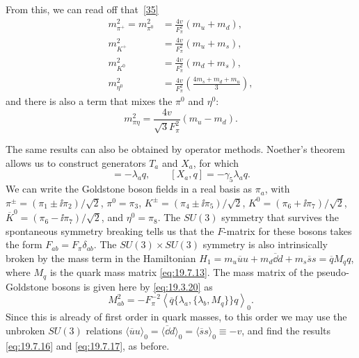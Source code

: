 From this, we can read off that~\hyperref[ch19-ref-35]{[35]}
\begin{equation}
\begin{aligned}
m_{\pi^+}^2=m_{\pi^0}^2
&=\frac{4v}{F_\pi^2}(m_u+m_d),\\
m_{K^+}^2
&=\frac{4v}{F_\pi^2}(m_u+m_s),\\
m_{K^0}^2
&=\frac{4v}{F_\pi^2}(m_d+m_s),\\
m_{\eta^0}^2
&=\frac{4v}{F_\pi^2}
\left(\frac{4m_s+m_d+m_u}{3}\right),
\end{aligned}
\tag{19.7.16}\label{eq:19.7.16}
\end{equation}
and there is also a term that mixes the $\pi^0$ and $\eta^0$:
\begin{equation}
m_{\pi\eta}^2
=\frac{4v}{\sqrt3F_\pi^2}(m_u-m_d).
\tag{19.7.17}\label{eq:19.7.17}
\end{equation}

The same results can also be obtained by operator methods. Noether's theorem allows us to construct generators $T_a$ and $X_a$, for which
\begin{equation}
[T_a,q]=-\lambda_aq,
\qquad
[X_a,q]=-\gamma_5\lambda_aq.
\tag{19.7.18}\label{eq:19.7.18}
\end{equation}
We can write the Goldstone boson fields in a real basis as $\pi_a$, with $\pi^\pm=(\pi_1\pm \ii\pi_2)/\sqrt2$, $\pi^0=\pi_3$, $K^\pm=(\pi_4\pm \ii\pi_5)/\sqrt2$, $K^0=(\pi_6+\ii\pi_7)/\sqrt2$, $\overline K^0=(\pi_6-\ii\pi_7)/\sqrt2$, and $\eta^0=\pi_8$. The $SU(3)$ symmetry that survives the spontaneous symmetry breaking tells us that the $F$-matrix for these bosons takes the form $F_{ab}=F_\pi\delta_{ab}$. The $SU(3)\times SU(3)$ symmetry is also intrinsically broken by the mass term in the Hamiltonian $H_1=m_u\overline uu+m_d\overline \dd d+m_s\overline ss=\overline qM_qq$, where $M_q$ is the quark mass matrix \eqref{eq:19.7.13}. The mass matrix of the pseudo-Goldstone bosons is given here by \eqref{eq:19.3.20} as
\begin{equation}
M_{ab}^2
=-F_\pi^{-2}
\left\langle\overline q\{\lambda_a,\{\lambda_b,M_q\}\}q\right\rangle_0.
\tag{19.7.19}\label{eq:19.7.19}
\end{equation}
Since this is already of first order in quark masses, to this order we may use the unbroken $SU(3)$ relations $\langle\overline uu\rangle_0=\langle\overline \dd d\rangle_0=\langle\overline ss\rangle_0\equiv-v$, and find the results \eqref{eq:19.7.16} and \eqref{eq:19.7.17}, as before.

